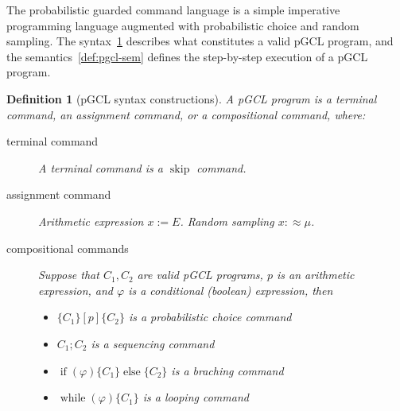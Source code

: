 \documentclass[a4paper]{article}
\newtheorem{definition}[theorem]{Definition}
\begin{document}
The probabilistic guarded command language\cite{pgcl} is a simple imperative programming language augmented with probabilistic choice and random sampling. The syntax~\ref{def:pgcl-syn} describes what constitutes a valid pGCL program, and the semantics~\ref{def:pgcl-sem} defines the step-by-step execution of a pGCL program.
\begin{definition}[pGCL syntax constructions]\label{def:pgcl-syn}
	A pGCL program is a terminal command,
	an assignment command,
	or a compositional command, where:
	\begin{description}
		\item[terminal command] A terminal command is a \(\operatorname{skip}\) command.
		\item[assignment command] Arithmetic expression \(x:=E\). Random sampling \(x :\approx \mu\).
		\item[compositional commands] Suppose that \(C_1,C_2\) are valid pGCL programs, \(p\) is an arithmetic expression, and \(\varphi\) is a conditional (boolean) expression, then
		      \begin{itemize}
			      \item \(\{C_1\}[p]\{C_2\}\) is a probabilistic choice command
			      \item \(C_1;C_2\) is a sequencing command
			      \item \(\operatorname{if}(\varphi)\{C_1\}\operatorname{else}\{C_2\}\) is a braching command
			      \item \(\operatorname{while}(\varphi)\{C_1\}\) is a looping command
		      \end{itemize}
	\end{description}
\end{definition}
\end{document}
